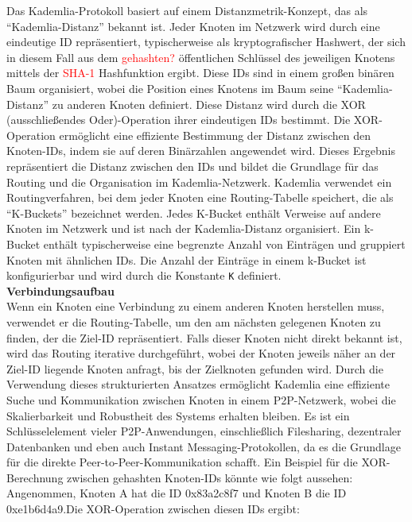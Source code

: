 Das Kademlia-Protokoll basiert auf einem Distanzmetrik-Konzept, das als \enquote{Kademlia-Distanz} bekannt ist. Jeder Knoten im Netzwerk wird durch eine eindeutige ID repräsentiert, typischerweise als kryptografischer Hashwert, der sich in diesem Fall aus dem \textcolor{red}{gehashten?} öffentlichen Schlüssel des jeweiligen Knotens mittels der \textcolor{red}{SHA-1} Hashfunktion ergibt. Diese IDs sind in einem großen binären Baum organisiert, wobei die Position eines Knotens im Baum seine \enquote{Kademlia-Distanz} zu anderen Knoten definiert. Diese Distanz wird durch die XOR (ausschließendes Oder)-Operation ihrer eindeutigen IDs bestimmt. Die XOR-Operation ermöglicht eine effiziente Bestimmung der Distanz zwischen den Knoten-IDs, indem sie auf deren Binärzahlen angewendet wird. Dieses Ergebnis repräsentiert die Distanz zwischen den IDs und bildet die Grundlage für das Routing und die Organisation im Kademlia-Netzwerk.
Kademlia verwendet ein Routingverfahren, bei dem jeder Knoten eine Routing-Tabelle speichert, die als \enquote{K-Buckets} bezeichnet werden. Jedes K-Bucket enthält Verweise auf andere Knoten im Netzwerk und ist nach der Kademlia-Distanz organisiert. Ein k-Bucket enthält typischerweise eine begrenzte Anzahl von Einträgen und gruppiert Knoten mit ähnlichen IDs. 
Die Anzahl der Einträge in einem k-Bucket ist konfigurierbar und wird durch die Konstante \texttt{K} definiert. 
 \\
\textbf{Verbindungsaufbau} \\
Wenn ein Knoten eine Verbindung zu einem anderen Knoten herstellen muss, verwendet er die Routing-Tabelle, um den am nächsten gelegenen Knoten zu finden, der die Ziel-ID repräsentiert. Falls dieser Knoten nicht direkt bekannt ist, wird das Routing iterative durchgeführt, wobei der Knoten jeweils näher an der Ziel-ID liegende Knoten anfragt, bis der Zielknoten gefunden wird. Durch die Verwendung dieses strukturierten Ansatzes ermöglicht Kademlia eine effiziente Suche und Kommunikation zwischen Knoten in einem P2P-Netzwerk, wobei die Skalierbarkeit und Robustheit des Systems erhalten bleiben. Es ist ein Schlüsselelement vieler P2P-Anwendungen, einschließlich Filesharing, dezentraler Datenbanken und eben auch Instant Messaging-Protokollen, da es die Grundlage für die direkte Peer-to-Peer-Kommunikation schafft. Ein Beispiel für die XOR-Berechnung zwischen gehashten Knoten-IDs könnte wie folgt aussehen:
Angenommen, Knoten A hat die ID 0x83a2c8f7 und Knoten B die ID 0xe1b6d4a9.Die XOR-Operation zwischen diesen IDs ergibt:

